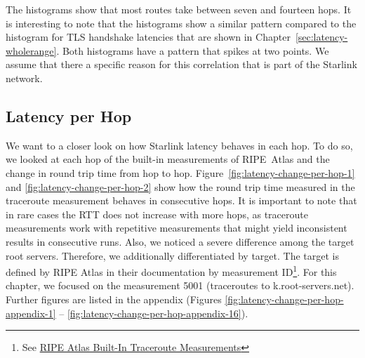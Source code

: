 The histograms show that most routes take between seven and fourteen hops.
It is interesting to note that the histograms show a similar pattern compared
to the histogram for TLS handshake latencies that are shown in
Chapter~\ref{sec:latency-wholerange}. Both histograms have a pattern that
spikes at two points. We assume that there a specific reason for this
correlation that is part of the Starlink network.

\subsection{Latency per Hop}

We want to a closer look on how Starlink latency behaves in each hop. To do so,
we looked at each hop of the built-in measurements of RIPE~Atlas and the change
in round trip time from hop to hop. Figure~\ref{fig:latency-change-per-hop-1}
and \ref{fig:latency-change-per-hop-2} show how the round trip time measured in
the traceroute measurement behaves in consecutive hops. It is important to note
that in rare cases the RTT does not increase with more hops, as traceroute
measurements work with repetitive measurements that might yield inconsistent
results in consecutive runs. Also, we noticed a severe difference among the
target root servers. Therefore, we additionally differentiated by target. The
target is defined by RIPE Atlas in their documentation by measurement
ID\footnote{See
	\href{https://atlas.ripe.net/docs/built-in-measurements/\#traceroute-5-000-6-999}{RIPE Atlas Built-In Traceroute Measurements}}.
For this chapter, we focused on the measurement 5001 (traceroutes to
k.root-servers.net). Further figures are listed in the appendix (Figures
\ref{fig:latency-change-per-hop-appendix-1} --
\ref{fig:latency-change-per-hop-appendix-16}).

